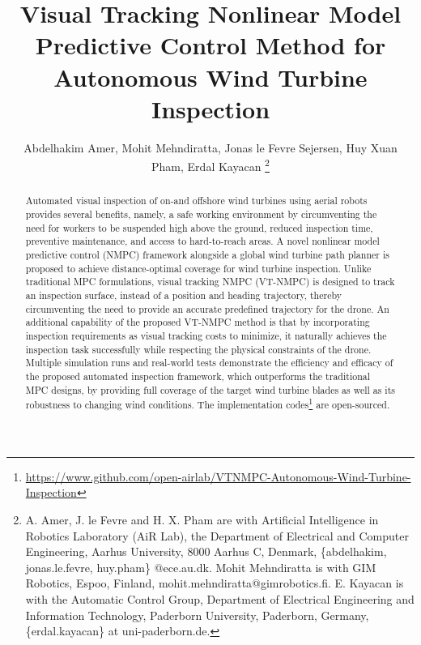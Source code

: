 \documentclass[letterpaper, 10 pt, conference]{ieeeconf}  %
\title{\LARGE \bf
Visual Tracking Nonlinear Model Predictive Control Method for Autonomous Wind Turbine Inspection
}
\author{ 
Abdelhakim Amer\orcidA{}, Mohit Mehndiratta\orcidB{}, Jonas le Fevre Sejersen\orcidC{}, Huy Xuan Pham\orcidE{}, Erdal Kayacan\orcidD{}%
\thanks{A. Amer, J. le Fevre and H. X. Pham are with Artificial Intelligence in Robotics Laboratory (AiR Lab), the Department of Electrical and Computer Engineering, Aarhus University, 8000 Aarhus C, Denmark, \{abdelhakim, jonas.le.fevre, huy.pham\} @ece.au.dk. Mohit Mehndiratta is with GIM Robotics, Espoo, Finland, mohit.mehndiratta@gimrobotics.fi. E. Kayacan is with the Automatic Control Group, Department of Electrical Engineering and Information Technology, Paderborn University, Paderborn, Germany,  \{erdal.kayacan\} at uni-paderborn.de.}
}
\begin{document}
\maketitle
\begin{abstract}


Automated visual inspection of on-and offshore wind turbines using aerial robots provides several benefits, namely, a safe working environment by circumventing the need for workers to be suspended high above the ground, reduced inspection time, preventive maintenance, and access to hard-to-reach areas. A novel nonlinear model predictive control (NMPC) framework alongside a global wind turbine path planner is proposed to achieve distance-optimal coverage for wind turbine inspection. Unlike traditional MPC formulations, visual tracking NMPC (VT-NMPC) is designed to track an inspection surface, instead of a position and heading trajectory, thereby circumventing the need to provide an accurate predefined trajectory for the drone. An additional capability of the proposed VT-NMPC method is that by incorporating inspection requirements as visual tracking costs to minimize, it naturally achieves the inspection task successfully while respecting the physical constraints of the drone. %
Multiple simulation runs and real-world tests demonstrate the efficiency and efficacy of the proposed automated inspection framework, which outperforms the traditional MPC designs, by providing full coverage of the target wind turbine blades as well as its robustness to changing wind conditions. The implementation codes\footnote{\url{https://www.github.com/open-airlab/VTNMPC-Autonomous-Wind-Turbine-Inspection}} are open-sourced.

\end{abstract}
\end{document}

